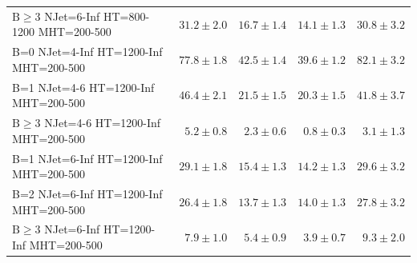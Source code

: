 \documentclass{beamer}
\begin{document}
\begin{frame}
\begin{tabular}{lrrrr}
   $\text{B}\geq3$ NJet=6-Inf HT=800-1200 MHT=200-500 &              $31.2\pm2.0$&              $16.7\pm1.4$&              $14.1\pm1.3$&                  $30.8\pm3.2$ \\ 
   B=0 NJet=4-Inf HT=1200-Inf MHT=200-500 &              $77.8\pm1.8$&              $42.5\pm1.4$&              $39.6\pm1.2$&                  $82.1\pm3.2$ \\ 
     B=1 NJet=4-6 HT=1200-Inf MHT=200-500 &              $46.4\pm2.1$&              $21.5\pm1.5$&              $20.3\pm1.5$&                  $41.8\pm3.7$ \\ 
     $\text{B}\geq3$ NJet=4-6 HT=1200-Inf MHT=200-500 &               $5.2\pm0.8$&               $2.3\pm0.6$&               $0.8\pm0.3$&                   $3.1\pm1.3$ \\ 
   B=1 NJet=6-Inf HT=1200-Inf MHT=200-500 &              $29.1\pm1.8$&              $15.4\pm1.3$&              $14.2\pm1.3$&                  $29.6\pm3.2$ \\ 
   B=2 NJet=6-Inf HT=1200-Inf MHT=200-500 &              $26.4\pm1.8$&              $13.7\pm1.3$&              $14.0\pm1.3$&                  $27.8\pm3.2$ \\ 
   $\text{B}\geq3$ NJet=6-Inf HT=1200-Inf MHT=200-500 &               $7.9\pm1.0$&               $5.4\pm0.9$&               $3.9\pm0.7$&                   $9.3\pm2.0$ \\ 
\bottomrule 
\end{tabular}

\end{frame}
\end{document}
